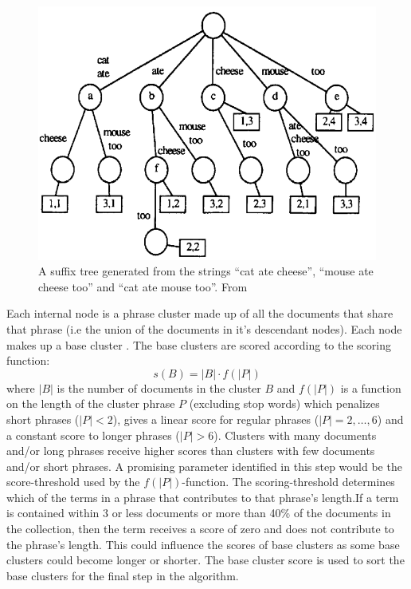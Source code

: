 \begin{figure}[!ht]
  \begin{center}
    \includegraphics[totalheight=0.3\textheight]{Figures/suffixtree}
  \end{center}
  \caption{A suffix tree generated from the strings “cat ate cheese”, “mouse ate cheese too” and “cat ate mouse too”. From  \protect \parencite[][48]{Oren1998}}
  \label{fig:suffixtree}
\end{figure}

Each internal node is a phrase cluster made up of all the documents that share that phrase (i.e the union of the documents in it's descendant nodes). Each node makes up a base cluster \cite{Oren1998}. The base clusters are scored according to the scoring function: 
\begin{displaymath}s(B) = 
\vert B \vert \cdot f(\vert P \vert)
\end{displaymath} 
where \(\vert B \vert\) 
is the number of documents in the cluster \(B\) and  \(f(\vert P \vert)\) is a function on the length of the cluster phrase \(P\) (excluding stop words) which penalizes short phrases (\( \vert P \vert < 2\)), gives a linear score for regular phrases (\(\vert P \vert = {2,\dots,6}\)) and a constant score to longer phrases (\( \vert P \vert > 6\)). Clusters with many documents and/or long phrases receive higher scores than clusters with few documents and/or short phrases. A promising parameter identified in this step would be the score-threshold used by the \(f(\vert P \vert)\)-function. The scoring-threshold determines which of the terms in a phrase that contributes to that phrase's length.If a term is contained within 3 or less documents or more than 40\% of the documents in the collection, then the term receives a score of zero and does not contribute to the phrase's length. This could influence the scores of base clusters as some base clusters could become longer or shorter. The base cluster score is used to sort the base clusters for the final step in the \STC algorithm.

